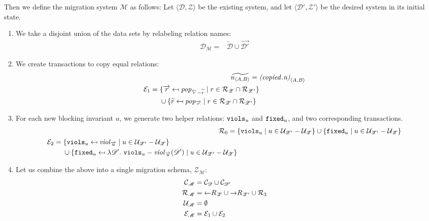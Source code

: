 \documentclass[runningheads]{llncs}
\newcommand{\id}[1]{\text{\it #1\/}}
\newcommand{\popF}[1]{\id{pop}_{#1}}
\newcommand{\viol}[2]{\violC{#1}(#2)}
\newcommand{\violC}[1]{\id{viol}_{#1}}
\newcommand{\declare}[3]{\id{#1}_{\pair{#2}{#3}}}
\newcommand{\pair}[2]{\langle{#1},{#2}\rangle}
\newcommand{\concepts}{\mathcal{C}}
\newcommand{\rels}{\mathcal{R}}   %
\newcommand{\transactions}{\mathcal{E}}
\newcommand{\rules}{\mathcal{U}}
\newcommand{\dataset}{\mathscr{D}}
\newcommand{\schema}{\mathscr{Z}}
\newcommand{\migrsys}{\mathscr{M}}
\begin{document}
   Then we define the migration system $\migrsys$ as follows:
   Let $\pair{\dataset}{\schema}$ be the existing system, and let $\pair{\dataset'}{\schema'}$ be the desired system in its initial state.
\begin{enumerate}
\item We take a disjoint union of the data sets by relabeling relation names:
   \begin{align}
      \dataset_\migrsys={}&\overleftarrow{\dataset}\cup\overrightarrow{\dataset'}
   \end{align}
\item We create transactions to copy equal relations:
   \begin{align}
      \widetilde{\declare{n}{A}{B}}={}&\declare{(\id{copied}.n)}{A}{B}\\
      \begin{split}
         \transactions_1={}&\{\overrightarrow{r}\mapsfrom \popF{\overleftarrow{r} - \widetilde{r}} \mid r \in \rels_\schema \cap \rels_{\schema'}\}\\
         &\cup\{\widetilde{r}\mapsfrom \popF{\overrightarrow{r}} \mid r \in \rels_\schema \cap \rels_{\schema'}\}
      \end{split}
   \end{align}
\item For each new blocking invariant $u$, we generate two helper relations: ${\tt viols}_u$ and ${\tt fixed}_u$, and two corresponding transactions.
   \begin{align}
      \rels_\theenumi={}& \{{\tt viols}_u\mid u \in \rules_{\schema'}-\rules_{\schema}\} \cup \{{\tt fixed}_u\mid u \in \rules_{\schema'}-\rules_{\schema}\}\\
      \begin{split}
         \transactions_2={}& \{{\tt viols}_u \mapsfrom \violC{\overrightarrow{u}}\mid u \in \rules_{\schema'}-\rules_{\schema}\}\\
         &\cup \{{\tt fixed}_u \mapsfrom \lambda \dataset'.~ {\tt viols}_u - \viol{\overrightarrow{u}}{\dataset'}\mid u \in \rules_{\schema'}-\rules_{\schema}\}
      \end{split}\label{eqn:enforceForRules}
   \end{align}
\item Let us combine the above into a single migration schema, $\schema_\migrsys$:
   \begin{align}
      \concepts_\migrsys ={}& \concepts_\dataset \cup  \concepts_{\dataset'}\\
      \rels_\migrsys ={}& \overleftarrow\rels_{\schema} \cup \overrightarrow\rels_{\schema'} \cup \rels_3\\
      \rules_\migrsys={}& \emptyset\label{eqn:migrsysrules}\\
      \transactions_\migrsys ={}& \transactions_1\cup\transactions_2
   \end{align}
\end{enumerate}
   
\end{document}
